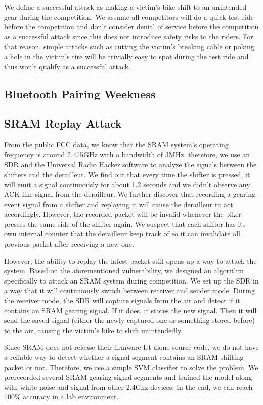 \documentclass[letterpaper,twocolumn,10pt]{article}
\begin{document}
We define a successful attack as making a victim's bike shift to an unintended gear during the competition. We assume all competitors will do a quick test ride before the competition and don't consider denial of service before the competition as a successful attack since this does not introduce safety risks to the riders. For that reason, simple attacks such as cutting the victim's breaking cable or poking a hole in the victim's tire will be trivially easy to spot during the test ride and thus won't qualify as a successful attack.


\subsection{Bluetooth Pairing Weekness}


\subsection{SRAM Replay Attack}
From the public FCC data, we know that the SRAM system's operating frequency is around 2.475GHz with a bandwidth of 3MHz, therefore, we use an SDR and the Universal Radio Hacker software\cite{urh}  to analyze the signals between the shifters and the derailleur. We find out that every time the shifter is pressed, it will emit a signal continuously for about 1.2 seconds and we didn't observe any ACK-like signal from the derailleur. We further discover that recording a gearing event signal from a shifter and replaying it will cause the derailleur to act accordingly. However, the recorded packet will be invalid whenever the biker presses the same side of the shifter again. We suspect that each shifter has its own internal counter that the derailleur keep track of so it can invalidate all previous packet after receiving a new one.

However, the ability to replay the latest packet still opens up a way to attack the system. Based on the aforementioned vulnerability, we designed an algorithm specifically to attack an SRAM system during competition. We set up the SDR in a way that it will continuously switch between receiver and sender mode. During the receiver mode, the SDR will capture signals from the air and detect if it contains an SRAM gearing signal. If it does, it stores the new signal. Then it will send the saved signal (either the newly captured one or something stored before) to the air, causing the victim's bike to shift unintendedly. 

Since SRAM does not release their firmware let alone source code, we do not have a reliable way to detect whether a signal segment contains an SRAM shifting packet or not. Therefore, we use a simple SVM classifier to solve the problem. We prerecorded several SRAM gearing signal segments and trained the model along with white noise and signal from other 2.4Ghz devices. In the end, we can reach 100\% accuracy in a lab environment.
\end{document}
